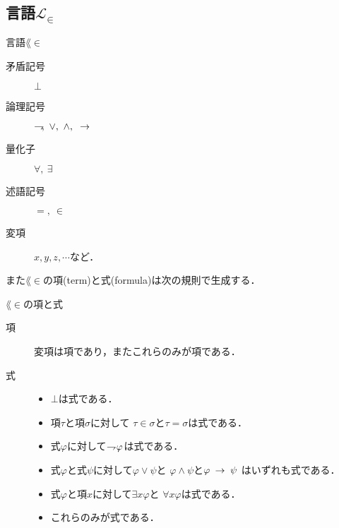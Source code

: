 \newpage
\subsection{言語$\mathcal{L}_{\in}$}
	
	\begin{itembox}[l]{言語$\lang{\in}$}
		\begin{description}
			\item[矛盾記号] $\bot$
			\item[論理記号] $\negation,\ \vee,\ \wedge,\ \rarrow$
			\item[量化子] $\forall,\ \exists$
			\item[述語記号] $=,\ \in$
			\item[変項] $x,y,z,\cdots$など．
		\end{description}
	\end{itembox}
	
	また$\lang{\in}$の項(term)と式(formula)は次の規則で生成する．
	
	\begin{itembox}[l]{$\lang{\in}$の項と式}
		\begin{description}
			\item[項] 変項は項であり，またこれらのみが項である．
				
			\item[式] 
				\begin{itemize}
					\item $\bot$は式である．
					\item 項$\tau$と項$\sigma$に対して
						$\tau \in \sigma$と$\tau = \sigma$は式である．
					\item 式$\varphi$に対して$\rightharpoondown\hspace{-0.25em} \varphi$は式である．
					\item 式$\varphi$と式$\psi$に対して$\varphi \vee \psi$と
						$\varphi \wedge \psi$と$\varphi \hspace{0.25em}\rightarrow\hspace{0.25em} \psi$
						はいずれも式である．
					\item 式$\varphi$と項$x$に対して$\exists x \varphi$と
						$\forall x \varphi$は式である．
					\item これらのみが式である．
				\end{itemize}
		\end{description}
	\end{itembox}
	
